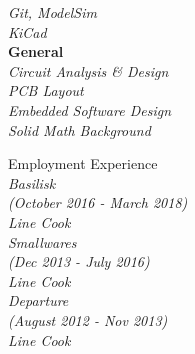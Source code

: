 \documentclass{article}
\newcommand\leftcolwidthvar{0.35}
\begin{document}
{\begin{minipage}[t]{\leftcolwidthvar \textwidth}
\begin{flushleft}
	\textsf{\textit{%
			Git, ModelSim\\\vspace{1pt}
			KiCad\\\vspace{1pt}}}
	\textbf{General\\\vspace{1pt}}
	\textsf{\textit{%
			Circuit Analysis \& Design\\\vspace{1pt}
			PCB Layout\\\vspace{1pt}
			Embedded Software Design\\\vspace{1pt}
			Solid Math Background\\\vspace{1pt}
	}}	
\end{flushleft}
\vspace{0.25ex}
%
%
\begin{flushleft}
	\textsf{\Large Employment Experience}\\
	\smallskip
	\textsf{\textit{%
			Basilisk \\(October 2016 - March 2018)\\ Line Cook\\\vspace{1pt}
			Smallwares \\(Dec 2013 - July 2016)\\ Line Cook\\\vspace{1pt}
			Departure \\(August 2012 - Nov 2013)\\ Line Cook\\\vspace{1pt}}}
\end{flushleft}
\end{minipage}}
\hfill
%
%
\end{document}

